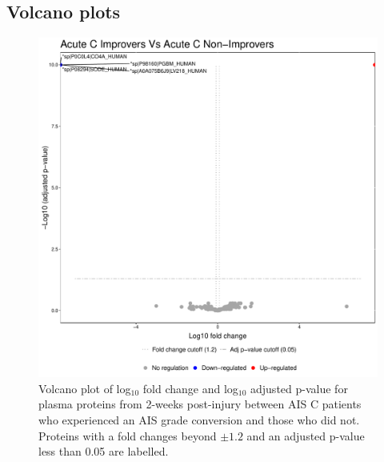 \documentclass[9pt,lineno]{elife}
\begin{document}
\clearpage

\hypertarget{sup-volc-plots}{%
\subsection{Volcano plots}\label{sup-volc-plots}}



\begin{figure}
\includegraphics[width=1\linewidth]{figures/openms_protein_quantification/label_free/volcano_plots/openms_volcano_plot_2021-08-10_0008} \caption{Volcano plot of log\(_10\) fold change and log\(_10\) adjusted p-value for plasma proteins from 2-weeks post-injury between AIS C patients who experienced an AIS grade conversion and those who did not. Proteins with a fold changes beyond \(\pm 1.2\) and an adjusted p-value less than 0.05 are labelled.}\label{fig:volc-plot-c-imp-vs-nonimp}
\end{figure}
\end{document}
